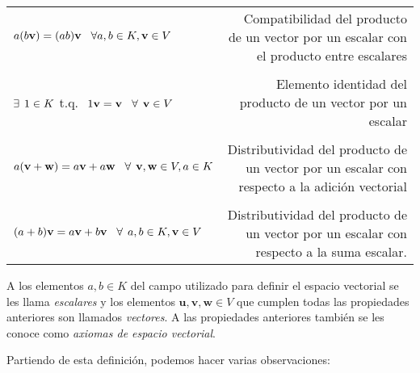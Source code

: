 \documentclass[12pt,dvipsnames]{article}
\begin{document}
\begin{tcolorbox}
\begin{center}
\begin{tabular}{lr}
    \multirow{2}{0.35\textwidth}{$a(b\mathbf{v})=(ab)\mathbf{v}\hspace{3mm}\forall a,b\in K, \mathbf{v}\in V$} & \multirow{2}{0.47\textwidth}{Compatibilidad del producto de un vector por un escalar con el producto entre escalares} \\ \\ \\
    \multirow{2}{0.4\textwidth}{$\exists\hspace{1.5mm}1\in K$ \hspace{1.5mm} t.q. $\hspace{1.5mm}1\mathbf{v}=\mathbf{v}\hspace{3mm}\forall\hspace{1.5mm} \mathbf{v}\in V$} & \multirow{2}{0.35\textwidth}{Elemento identidad del producto de un vector por un escalar} \\ \\ \\
    \multirow{2}{0.4\textwidth}{$a(\mathbf{v}+\mathbf{w})=a\mathbf{v}+a\mathbf{w}\hspace{3mm}\forall\hspace{1.5mm} \mathbf{v},\mathbf{w}\in V, a\in K$} & \multirow{2}{0.47\textwidth}{Distributividad del producto de un vector por un escalar con respecto a la adición vectorial}  \\ \\ \\
    \multirow{2}{0.4\textwidth}{$(a+b)\mathbf{v}=a\mathbf{v}+b\mathbf{v}\hspace{3mm}\forall\hspace{1.5mm} a,b\in K, \mathbf{v}\in V$} & \multirow{2}{0.47\textwidth}{Distributividad del producto de un vector por un escalar con respecto a la suma escalar.} \\ \\
\end{tabular}
\end{center}

\hspace{2.5mm} A los elementos $a,b \in K$ del campo utilizado para definir el espacio vectorial se les llama \textit{escalares} y los elementos $\mathbf{u},\mathbf{v},\mathbf{w}\in V$ que cumplen todas las propiedades anteriores son llamados \textit{vectores}. A las propiedades anteriores también se les conoce como \textit{axiomas de espacio vectorial}.

\end{tcolorbox}

Partiendo de esta definición, podemos hacer varias observaciones:
\end{document}
